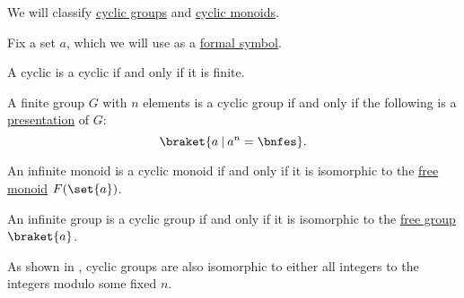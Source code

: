\begin{proposition}\label{thm:cyclic_monoid_classification}
  We will classify \hyperref[def:cyclic_group]{cyclic groups} and \hyperref[def:cyclic_monoid]{cyclic monoids}.

  Fix a set \( a \), which we will use as a \hyperref[def:formal_language/symbol]{formal symbol}.

  \begin{thmenum}
     A cyclic  is a cyclic  if and only if it is finite.

     A finite group \( G \) with \( n \) elements is a cyclic group if and only if the following is a \hyperref[def:group_presentation]{presentation} of \( G \):
    \begin{equation}\label{eq:thm:cyclic_monoid_classification/finite_group}
      \braket{ a \given a^n = \bnfes }.
    \end{equation}

     An infinite monoid is a cyclic monoid if and only if it is isomorphic to the \hyperref[def:free_monoid]{free monoid} \( F(\set{ a }) \).

     An infinite group is a cyclic group if and only if it is isomorphic to the \hyperref[def:free_group]{free group} \( \braket{ a } \).
  \end{thmenum}
\end{proposition}
\begin{comments}
  \item As shown in , cyclic groups are also isomorphic to either all integers to the integers modulo some fixed \( n \).
\end{comments}
